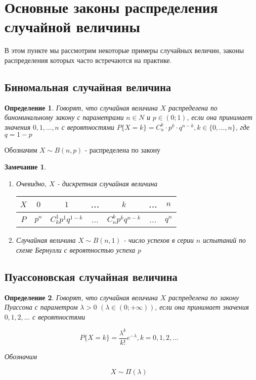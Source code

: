 \documentclass[a4paper, 14pt]{report}
\newtheorem{defenition}{Определение}[chapter]
\newtheorem{note}{Замечание}[chapter]
\begin{document}
\section{Основные законы распределения случайной величины}

В этом пункте мы рассмотрим некоторые примеры случайных величин, законы распределения которых часто встречаются на практике.

\subsection{Биномальная случайная величина}

\begin{defenition}
    Говорят, что случайная величина $X$ распределена по биноминальному закону с параметрами $n \in N$ и $p \in (0;1)$, если она принимает значения $0,1,...,n$ с вероятностями $P\{X = k\} = C_n^k \cdot p^k \cdot q^{n-k}, k \in \{0,...,n\}$, где $q = 1-p$
\end{defenition}

Обозначим $X \sim B(n,p)$ - распределена по закону

\begin{note}
    \begin{enumerate}
        \item Очевидно, $X$ - дискретная случайная величина

        \begin{tabular}{|c||c|c|c|c|c|c|}
            \hline
            $X$ & $0$ & $1$ & ... & $k$ & ... & $n$ \\
            \hline
            $P$ & $p^n$ & $C_k^1p^1q^{1-k}$ & ... & $C_n^kp^kq^{n-k}$ & ... & $q^n$ \\
            \hline
        \end{tabular}

    \item Случайная величина $X \sim B(n,1)$ - число успехов в серии $n$ испытаний по схеме Бернулли с вероятностью успеха $p$
    \end{enumerate}
\end{note}

\subsection{Пуассоновская случайная величина}

\begin{defenition}
    Говорят, что случайная величина $X$ распределена по закону Пуассона с параметром $\lambda > 0$ $(\lambda \in (0; + \infty))$, если она принимает значения $0,1,2,...$ с вероятностями

    $$
    P\{X=k\} = \frac{\lambda^k}{k!}e^{-\lambda}, k = 0, 1, 2, ...
    $$

    Обозначим

    $$
    X \sim \Pi(\lambda)
    $$
\end{defenition}
\end{document}
